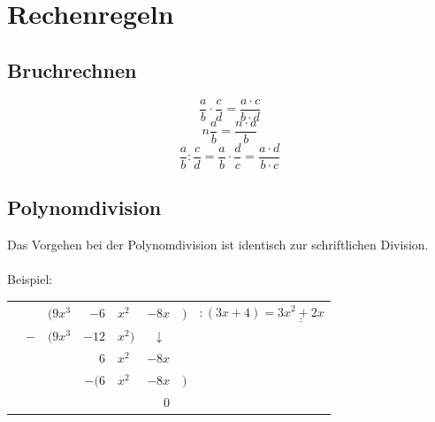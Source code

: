 



\section{Rechenregeln}
\subsection{Bruchrechnen}
\[ \boxed{\frac{a}{b} \cdot \frac{c}{d} = \frac{a \cdot c}{b \cdot d}} \]
\[ \boxed{n \frac{a}{b} = \frac{n \cdot a}{b}} \]
\[ \boxed{\frac{a}{b} : \frac{c}{d} = \frac{a}{b} \cdot \frac{d}{c} = \frac{a \cdot d}{b \cdot c}} \]

\subsection{Polynomdivision}
Das Vorgehen bei der Polynomdivision ist identisch zur schriftlichen Division. \\\\
Beispiel: 

\begin{tabular}{|r@{}r@{}r@{}r@{}l@{}r@{}r@{}l|}
\hline
\rule{0pt}{12pt}&&$(9x^3 $&$- 6$&$x^2 $&$- 8x$&$)$&$:(3x + 4) = \underline{\underline{3x^2 + 2x}}$\\
&$-$&$(9x^3 $&$- 12$&$x^2)$&$\downarrow\,\,$&&\\
\cline{2-5}\rule{0pt}{12pt}&&&$6$&$x^2 $&$- 8x$&&\\
&&&$-(6$&$x^2 $&$- 8x$&$)$&\\
\cline{4-7}\rule{0pt}{12pt}&&&&&$0$&&\\
\hline
\end{tabular}


